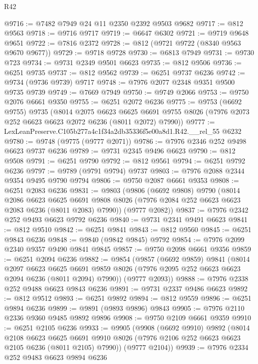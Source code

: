 \begin{lexlean}{R42}
\begin{coremodule}
{@9716 := @7482 @7949 @24 @11 @2350 @2392 @9503 @9682
@9717 := @812 @9563
@9718 := @9716 @9717
@9719 := @6647 @6302
@9721 := @9719 @9648 @9651
@9722 := @7816 @2372
@9728 := @812 (@9721 @9722 (@8340 @9563 @9670 @9677))
@9729 := @9718 @9728
@9730 := @6813 @7949
@9731 := @9730 @723
@9734 := @9731 @2349 @9501 @6623
@9735 := @812 @9506
@9736 := @6251 @9735
@9737 := @812 @9562
@9739 := @6251 @9737 @6236
@9742 := @9734 (@9736 @9739) @9717
@9748 := @7976 @2077 @2348 @9351 @9500 @9735 @9739
@9749 := @7669 @7949
@9750 := @9749 @2066
@9753 := @9750 @2076 @6661 @9350
@9755 := @6251 @2072 @6236
@9775 := @9753
    (@6692 @9755)
    @9735
    (@8014
      @2075
      @6623
      @6625
      @6691
      @9755
      @8026
      (@7976 @2073 @252 @6623 @6623 @2072 @6236 (@8011 @2072) @7990))
@9777 := LexLeanPreserve.C105b277a4c1f34a2db35336f5e00a8d1.R42.__rel_55 @6232
@9780 := @9748 (@9775 (@9777 @2071))
@9786 := @7976 @2346 @252 @9498 @6623 @9737 @6236
@9789 := @9731 @2345 @9496 @6623
@9790 := @812 @9508
@9791 := @6251 @9790
@9792 := @812 @9561
@9794 := @6251 @9792 @6236
@9797 := @9789 (@9791 @9794) @9737
@9803 := @7976 @2088 @2344 @9354 @9495 @9790 @9794
@9806 := @9750 @2087 @6661 @9353
@9808 := @6251 @2083 @6236
@9831 := @9803
    (@9806
      (@6692 @9808)
      @9790
      (@8014
        @2086
        @6623
        @6625
        @6691
        @9808
        @8026
        (@7976 @2084 @252 @6623 @6623 @2083 @6236 (@8011 @2083) @7990))
      (@9777 @2082))
@9837 := @7976 @2342 @252 @9493 @6623 @9792 @6236
@9840 := @9731 @2341 @9491 @6623
@9841 := @812 @9510
@9842 := @6251 @9841
@9843 := @812 @9560
@9845 := @6251 @9843 @6236
@9848 := @9840 (@9842 @9845) @9792
@9854 := @7976 @2099 @2340 @9357 @9490 @9841 @9845
@9857 := @9750 @2098 @6661 @9356
@9859 := @6251 @2094 @6236
@9882 := @9854
    (@9857
      (@6692 @9859)
      @9841
      (@8014
        @2097
        @6623
        @6625
        @6691
        @9859
        @8026
        (@7976 @2095 @252 @6623 @6623 @2094 @6236 (@8011 @2094) @7990))
      (@9777 @2093))
@9888 := @7976 @2338 @252 @9488 @6623 @9843 @6236
@9891 := @9731 @2337 @9486 @6623
@9892 := @812 @9512
@9893 := @6251 @9892
@9894 := @812 @9559
@9896 := @6251 @9894 @6236
@9899 := @9891 (@9893 @9896) @9843
@9905 := @7976 @2110 @2336 @9360 @9485 @9892 @9896
@9908 := @9750 @2109 @6661 @9359
@9910 := @6251 @2105 @6236
@9933 := @9905
    (@9908
      (@6692 @9910)
      @9892
      (@8014
        @2108
        @6623
        @6625
        @6691
        @9910
        @8026
        (@7976 @2106 @252 @6623 @6623 @2105 @6236 (@8011 @2105) @7990))
      (@9777 @2104))
@9939 := @7976 @2334 @252 @9483 @6623 @9894 @6236
}
\end{coremodule}
\end{lexlean}

